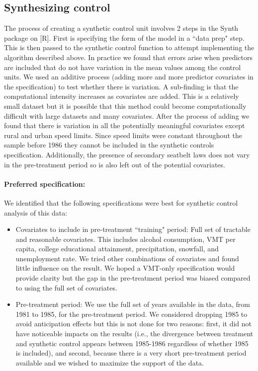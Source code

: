 \documentclass[letterpaper, 12pt]{article}
\begin{document}
\subsection{Synthesizing control} The process of creating a synthetic control unit involves 2 steps in the Synth package on [R].  First is specifying the form of the model in a ``data prep" step.  This is then passed to the synthetic control function to attempt implementing the algorithm described above.  In practice we found that errors arise when predictors are included that do not have variation in the mean values among the control units.  We used an additive process (adding more and more predictor covariates in the specification) to test whether there is variation.  A sub-finding is that the computational intensity increases as covariates are added.  This is a relatively small dataset but it is possible that this method could become computationally difficult with large datasets and many covariates.  After the process of adding we found that there is variation in all the potentially meaningful covariates except rural and urban speed limits.  Since speed limits were constant throughout the sample before 1986 they cannot be included in the synthetic controls specification.  Additionally, the presence of secondary seatbelt laws does not vary in the pre-treatment period so is also left out of the potential covariates.  

\paragraph{Preferred specification:} We identified that the following specifications were best for synthetic control analysis of this data:

\begin{itemize}

\item{Covariates to include in pre-treatment ``training" period: Full set of tractable and reasonable covariates.  This includes alcohol consumption, VMT per capita, college educational attainment, precipitation, snowfall, and unemployment rate.  We tried other combinations of covariates and found little influence on the result.  We hoped a VMT-only specification would provide clarity but the gap in the pre-treatment period was biased compared to using the full set of covariates.}

\item{Pre-treatment period: We use the full set of years available in the data, from 1981 to 1985, for the pre-treatment period.  We considered dropping 1985 to avoid anticipation effects but this is not done for two reasons: first, it did not have noticeable impacts on the results (i.e., the divergence between treatment and synthetic control appears between 1985-1986 regardless of whether 1985 is included), and second, because there is a very short pre-treatment period available and we wished to maximize the support of the data.}

\end{itemize}
\end{document}
